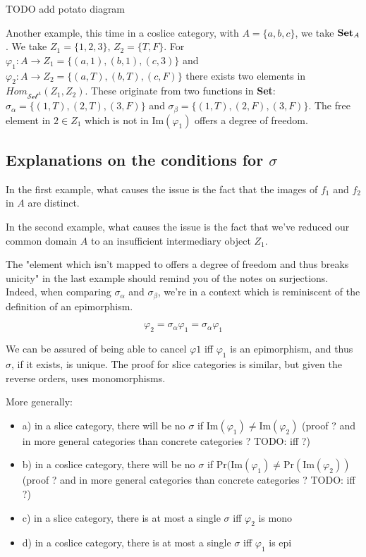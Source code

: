 \documentclass[12pt, letterpaper, twoside]{report}
\begin{document}
TODO add potato diagram

Another example, this time in a coslice category, with $A = \{ a, b, c \}$, we take $\text{\textbf{Set}}_A$. We take $Z_1 = \{ 1, 2, 3 \}$, $Z_2 = \{T, F\}$. For $\varphi_1 : A \to Z_1 = \{(a, 1), (b, 1), (c, 3)\}$ and $\varphi_2 : A \to Z_2 = \{(a, T), (b, T), (c, F)\}$ there exists two elements in $Hom_{\mathcal{Set}^A} (Z_1, Z_2)$. These originate from two functions in \textbf{Set}: $\sigma_\alpha = \{ (1, T), (2, T), (3, F) \}$ and $\sigma_\beta = \{ (1, T), (2, F), (3, F) \}$. The free element in $2 \in Z_1$ which is not in $\text{Im} (\varphi_1)$ offers a degree of freedom.


\subsection*{Explanations on the conditions for $\sigma$}

In the first example, what causes the issue is the fact that the images of $f_1$ and $f_2$ in $A$ are distinct.

In the second example, what causes the issue is the fact that we've reduced our common domain $A$ to an insufficient intermediary object $Z_1$. 

The "element which isn't mapped to offers a degree of freedom and thus breaks unicity" in the last example should remind you of the notes on surjections. Indeed, when comparing $\sigma_\alpha$ and $\sigma_\beta$, we're in a context which is reminiscent of the definition of an epimorphism.

$$\varphi_2 = \sigma_\alpha \varphi_1 = \sigma_\alpha \varphi_1 $$

We can be assured of being able to cancel $\varphi 1$ iff $\varphi_1$ is an epimorphism, and thus $\sigma$, if it exists, is unique. The proof for slice categories is similar, but given the reverse orders, uses monomorphisms.

More generally: 

\begin{itemize}
	\item a) in a slice category, there will be no $\sigma$ if $\text{Im} (\varphi_1) \neq \text{Im} (\varphi_2)$ (proof ? and in more general categories than concrete categories ? TODO: iff ?)
	\item b) in a coslice category, there will be no $\sigma$ if $\text{Pr} (\text{Im} (\varphi_1) \neq \text{Pr} (\text{Im} (\varphi_2))$ (proof ? and in more general categories than concrete categories ? TODO: iff ?)
	\item c) in a slice category, there is at most a single $\sigma$ iff $\varphi_2$ is mono
	\item d) in a coslice category, there is at most a single $\sigma$ iff $\varphi_1$ is epi
\end{itemize}
\end{document}
